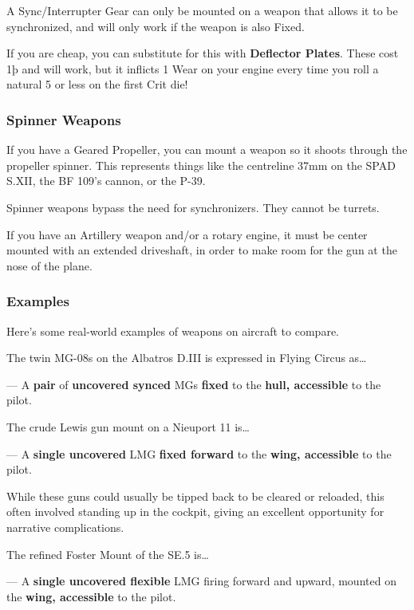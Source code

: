 \documentclass{article}
\begin{document}
A Sync/Interrupter Gear can only be mounted on a weapon that allows it
to be synchronized, and will only work if the weapon is also Fixed.

If you are cheap, you can substitute for this with \textbf{Deflector
    Plates}. These cost 1þ and will work, but it inflicts 1 Wear on your
engine every time you roll a natural 5 or less on the first Crit die!

\subsubsection{Spinner Weapons}
\label{_Spinner_Weapons}

If you have a Geared Propeller, you can mount a weapon so it shoots
through the propeller spinner. This represents things like the
centreline 37mm on the SPAD S.XII, the BF 109's cannon, or the P-39.

Spinner weapons bypass the need for synchronizers. They cannot be
turrets.

If you have an Artillery weapon and/or a rotary engine, it must be
center mounted with an extended driveshaft, in order to make room for
the gun at the nose of the plane.

\subsubsection{Examples}
\label{_Examples}

Here's some real-world examples of weapons on aircraft to compare.

The twin MG-08s on the Albatros D.III is expressed in Flying Circus
as\ldots{}

--- A \textbf{pair} of \textbf{uncovered
    synced} MGs \textbf{fixed} to the
\textbf{hull, accessible }to
the pilot.

The crude Lewis gun mount on a Nieuport 11 is\ldots{}

--- A \textbf{single uncovered} LMG \textbf{fixed forward} to the \textbf{wing, accessible} to
the pilot.

While these guns could usually be tipped back to be cleared or
reloaded, this often involved standing up in the cockpit, giving an
excellent opportunity for narrative complications.

The refined Foster Mount of the SE.5 is\ldots{}

--- A \textbf{single uncovered flexible} LMG firing forward and upward, mounted on the
\textbf{wing, accessible} to
the pilot.
\end{document}
